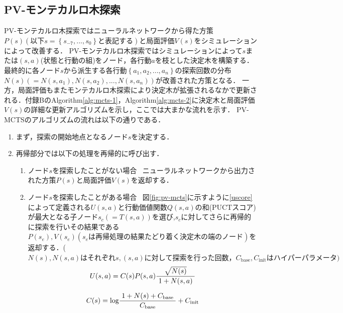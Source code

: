 \subsection{PV-モンテカルロ木探索}
PV-モンテカルロ木探索ではニューラルネットワークから得た方策$P(s)(以下s=\left\{ s_{-7}, ..., s_0 \right\}と表記する)$と局面評価$V(s)$をシミュレーション
によって改善する．
PV-モンテカルロ木探索ではシミュレーションによって$s$または$(s, a)$(状態と行動の組)をノード，各行動$a$を枝とした決定木を構築する．
最終的に各ノード$s$から派生する各行動$\left\{a_1, a_2, ..., a_n\right\}$の探索回数の分布$N(s)(={N(s, a_1), N(s, a_2), ..., N(s, a_n)})$が改善された方策となる．
一方，局面評価もまたモンテカルロ木探索により決定木が拡張されるなかで更新される．付録BのAlgorithm\ref{alg:mcts-1}，Algorithm\ref{alg:mcts-2}に決定木と局面評価$V(s)$の詳細な更新アルゴリズムを示し，ここでは大まかな流れを示す．
PV-MCTSのアルゴリズムの流れは以下の通りである．

\begin{enumerate}
    \item まず，探索の開始地点となるノード$s$を決定する．
    \item 再帰部分では以下の処理を再帰的に呼び出す．
    \begin{enumerate}
        \item ノード$s$を探索したことがない場合~
        ニューラルネットワークから出力された方策$P(s)$と局面評価$V(s)$を返却する．
        \item ノード$s$を探索したことがある場合~
        図\ref{fig:pv-mcts}に示すように\ref{uscore}によって定義される$U(s, a)$と行動価値関数$Q(s, a)$の和(PUCTスコア)が最大となる子ノード$s_c(=T(s, a))$を選び,$s_c$に対してさらに再帰的に探索を行いその結果である$P(s_e), V(s_e)(s_eは再帰処理の結果たどり着く
        決定木の端のノード)$を返却する．($N(s), N(s, a)はそれぞれs,(s, a)に対して探索を行った回数，  C_{\textrm{base}}, C_{\textrm{init}}はハイパーパラメータ)$
        \begin{equation}
			\label{uscore}
            {U(s, a)= C(s)P(s, a)\frac{\sqrt{N(s)}}{1+N(s, a)}\\
            }
        \end{equation}
        
        \begin{equation}
            {C(s)=\textrm{log}\frac{1+N(s)+C_{\textrm{base}}}{C_{\textrm{base}}}+C_{\textrm{init}}\\
           }
        \end{equation}
    \end{enumerate}
\end{enumerate}

